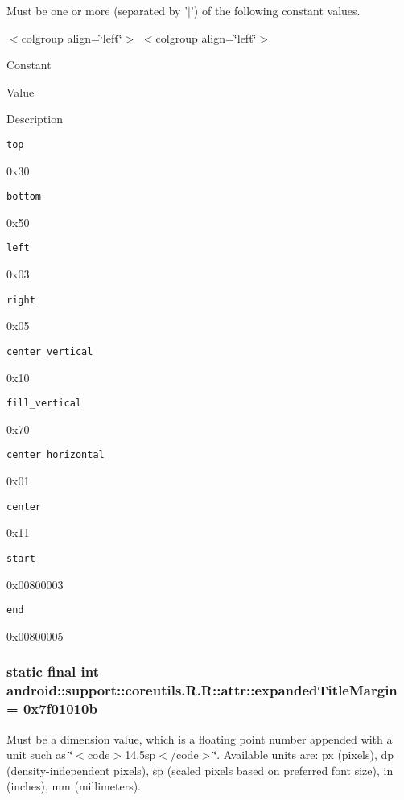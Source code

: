 Must be one or more (separated by '$|$') of the following constant values. \begin{TabularC}{0}
\hline
\end{TabularC}
$<$colgroup align=\char`\"{}left\char`\"{}$>$ $<$colgroup align=\char`\"{}left\char`\"{}$>$ 

Constant

Value

Description 

{\tt top}

0x30

{\tt bottom}

0x50

{\tt left}

0x03

{\tt right}

0x05

{\tt center\_\-vertical}

0x10

{\tt fill\_\-vertical}

0x70

{\tt center\_\-horizontal}

0x01

{\tt center}

0x11

{\tt start}

0x00800003

{\tt end}

0x00800005\hypertarget{classandroid_1_1support_1_1coreutils_1_1_r_1_1attr_bf5cb9b27d43f11587e3d53a30d64034}{
\subsubsection[{expandedTitleMargin}]{\setlength{\rightskip}{0pt plus 5cm}static final int android::support::coreutils.R.R::attr::expandedTitleMargin = 0x7f01010b}}
\label{classandroid_1_1support_1_1coreutils_1_1_r_1_1attr_bf5cb9b27d43f11587e3d53a30d64034}


Must be a dimension value, which is a floating point number appended with a unit such as \char`\"{}$<$code$>$14.5sp$<$/code$>$\char`\"{}. Available units are: px (pixels), dp (density-independent pixels), sp (scaled pixels based on preferred font size), in (inches), mm (millimeters). 

